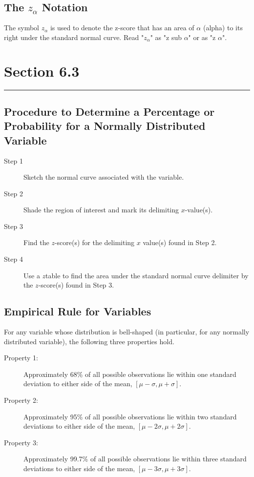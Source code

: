 \documentclass[12pt]{article}
\begin{document}
        \subsection*{The $z_\alpha$ Notation}
            The symbol $z_\alpha$ is used to denote the z-score that has an area of $\alpha$ (alpha)
            to its right under the standard normal curve. Read "$z_\alpha$" as "z sub $\alpha$" or
            as "z $\alpha$".

    
    \section*{Section 6.3}
    \noindent\rule{\textwidth}{0.4pt}
        \subsection*{Procedure to Determine a Percentage or Probability for a Normally Distributed
        Variable}
            \begin{description}
                \item[Step 1] Sketch the normal curve associated with the variable.
                \item[Step 2] Shade the region of interest and mark its delimiting $x$-value(s).
                \item[Step 3] Find the $z$-score(s) for the delimiting $x$ value(s) found in Step 2.
                \item[Step 4] Use a $z$table to find the area under the standard normal curve
                delimiter by the $z$-score(s) found in Step 3.               
            \end{description}
        \subsection*{Empirical Rule for Variables}
            For any variable whose distribution is bell-shaped (in particular, for any normally
            distributed variable), the following three properties hold.
            \begin{description}
                \item[Property 1:] Approximately 68\% of all possible observations lie within one
                standard deviation to either side of the mean, $[\mu - \sigma, \mu + \sigma]$.
                \item[Property 2:] Approximately 95\% of all possible observations lie within two
                standard deviations to either side of the mean, $[\mu - 2\sigma, \mu + 2\sigma]$. 
                \item[Property 3:] Approximately 99.7\% of all possible observations lie within
                three standard deviations to either side of the mean, 
                $[\mu - 3\sigma, \mu + 3\sigma]$.                
            \end{description}
\end{document}
